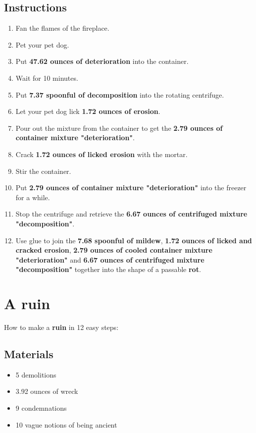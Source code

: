 \documentclass{article}
\begin{document}
\subsection{Instructions}\begin{enumerate}
\item 
Fan the flames of the fireplace.
\item 
Pet your pet dog.
\item 
Put \textbf{47.62 ounces of deterioration} into the container.
\item 
Wait for 10 minutes.
\item 
Put \textbf{7.37 spoonful of decomposition} into the rotating centrifuge.
\item 
Let your pet dog lick \textbf{1.72 ounces of erosion}.
\item 
Pour out the mixture from the container to get the \textbf{2.79 ounces of container mixture "deterioration"}.
\item 
Crack \textbf{1.72 ounces of licked erosion} with the mortar.
\item 
Stir the container.
\item 
Put \textbf{2.79 ounces of container mixture "deterioration"} into the freezer for a while.
\item 
Stop the centrifuge and retrieve the \textbf{6.67 ounces of centrifuged mixture "decomposition"}.
\item 
Use glue to join the \textbf{7.68 spoonful of mildew}, \textbf{1.72 ounces of licked and cracked erosion}, \textbf{2.79 ounces of cooled container mixture "deterioration"} and \textbf{6.67 ounces of centrifuged mixture "decomposition"} together into the shape of a passable \textbf{rot}.
\end{enumerate}
\newpage
\section{A ruin}How to make a \textbf{ruin} in 12 easy steps:

\subsection{Materials}\begin{itemize}
\item 
5 demolitions
\item 
3.92 ounces of wreck
\item 
9 condemnations
\item 
10 vague notions of being ancient
\end{itemize}
\end{document}
